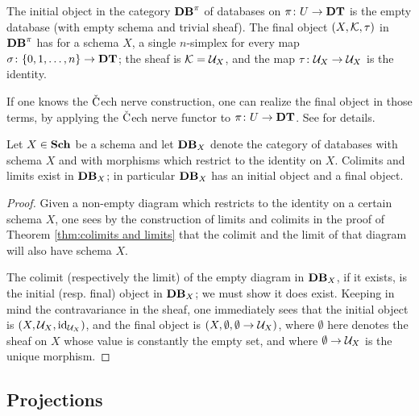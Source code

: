 \documentclass{amsart}
\def\DT{{\bf DT}}
\def\Sch{{\bf Sch}}
\def\Cech{$\check{\tn{C}}$ech }
\def\Data{{\bf DB}}
\begin{document}
\begin{remark}

The initial object in the category $\Data^\pi$ of databases on $\pi\taking U\to\DT$ is the empty database (with empty schema and trivial sheaf).  The final object $(X,\mathcal{K},\tau)$ in $\Data^\pi$ has for a schema $X$, a single $n$-simplex for every map $\sigma\taking\{0,1,\ldots,n\}\to\DT$; the sheaf is $\mathcal{K}=\mathcal{U}_X$, and the map $\tau\colon\mathcal{U}_X\rightarrow\mathcal{U}_X$ is the identity.

If one knows the \Cech nerve construction, one can realize the final object in those terms, by applying the \Cech nerve functor to $\pi\taking U\to\DT$.  See \cite[3.1]{Spi} for details.

\end{remark}

\begin{corollary}\label{cor:colimits and limits}

Let $X\in\Sch$ be a schema and let $\Data_X$ denote the category of databases with schema $X$ and with morphisms which restrict to the identity on $X$.  Colimits and limits exist in $\Data_X$; in particular $\Data_X$ has an initial object and a final object.

\end{corollary}

\begin{proof}

Given a non-empty diagram which restricts to the identity on a certain schema $X$, one sees by the construction of limits and colimits in the proof of Theorem \ref{thm:colimits and limits} that the colimit and the limit of that diagram will also have schema $X$.  

The colimit (respectively the limit) of the empty diagram in $\Data_X$, if it exists, is the initial (resp. final) object in $\Data_X$; we must show it does exist.  Keeping in mind the contravariance in the sheaf, one immediately sees that the initial object is $(X,\mathcal{U}_X,\textnormal{id}_{\mathcal{U}_X})$, and the final object is $(X,\emptyset,\emptyset\rightarrow\mathcal{U}_X)$, where $\emptyset$ here denotes the sheaf on $X$ whose value is constantly the empty set, and where $\emptyset\rightarrow\mathcal{U}_X$ is the unique morphism.


\end{proof}

\subsection{Projections}\label{subsec:projections}
\end{document}
